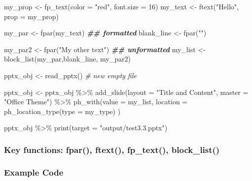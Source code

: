 \documentclass[
]{book}
\newenvironment{Shaded}{\begin{snugshade}}{\end{snugshade}}
\newcommand{\AttributeTok}[1]{\textcolor[rgb]{0.77,0.63,0.00}{#1}}
\newcommand{\CommentTok}[1]{\textcolor[rgb]{0.56,0.35,0.01}{\textit{#1}}}
\newcommand{\DecValTok}[1]{\textcolor[rgb]{0.00,0.00,0.81}{#1}}
\newcommand{\DocumentationTok}[1]{\textcolor[rgb]{0.56,0.35,0.01}{\textbf{\textit{#1}}}}
\newcommand{\FunctionTok}[1]{\textcolor[rgb]{0.00,0.00,0.00}{#1}}
\newcommand{\NormalTok}[1]{#1}
\newcommand{\OtherTok}[1]{\textcolor[rgb]{0.56,0.35,0.01}{#1}}
\newcommand{\SpecialCharTok}[1]{\textcolor[rgb]{0.00,0.00,0.00}{#1}}
\newcommand{\StringTok}[1]{\textcolor[rgb]{0.31,0.60,0.02}{#1}}
\begin{document}
\begin{Shaded}
\begin{Highlighting}[]
\NormalTok{my\_prop }\OtherTok{\textless{}{-}} \FunctionTok{fp\_text}\NormalTok{(}\AttributeTok{color =} \StringTok{"red"}\NormalTok{, }\AttributeTok{font.size =} \DecValTok{16}\NormalTok{)}
\NormalTok{my\_text }\OtherTok{\textless{}{-}} \FunctionTok{ftext}\NormalTok{(}\StringTok{"Hello"}\NormalTok{, }\AttributeTok{prop =}\NormalTok{ my\_prop)}

\NormalTok{my\_par }\OtherTok{\textless{}{-}} \FunctionTok{fpar}\NormalTok{(my\_text) }\DocumentationTok{\#\# formatted}
\NormalTok{blank\_line }\OtherTok{\textless{}{-}} \FunctionTok{fpar}\NormalTok{(}\StringTok{""}\NormalTok{)}

\NormalTok{my\_par2 }\OtherTok{\textless{}{-}} \FunctionTok{fpar}\NormalTok{(}\StringTok{"My other text"}\NormalTok{) }\DocumentationTok{\#\# unformatted}
\NormalTok{my\_list }\OtherTok{\textless{}{-}} \FunctionTok{block\_list}\NormalTok{(my\_par,blank\_line, my\_par2)}

\NormalTok{pptx\_obj }\OtherTok{\textless{}{-}} \FunctionTok{read\_pptx}\NormalTok{() }\CommentTok{\# new empty file}

\NormalTok{pptx\_obj }\OtherTok{\textless{}{-}}\NormalTok{ pptx\_obj }\SpecialCharTok{\%\textgreater{}\%}
  \FunctionTok{add\_slide}\NormalTok{(}\AttributeTok{layout =} \StringTok{"Title and Content"}\NormalTok{, }\AttributeTok{master =} \StringTok{"Office Theme"}\NormalTok{) }\SpecialCharTok{\%\textgreater{}\%} 
  \FunctionTok{ph\_with}\NormalTok{(}\AttributeTok{value =}\NormalTok{ my\_list, }\AttributeTok{location =} \FunctionTok{ph\_location\_type}\NormalTok{(}\AttributeTok{type =}\NormalTok{ my\_type) )}

\NormalTok{pptx\_obj }\SpecialCharTok{\%\textgreater{}\%}
  \FunctionTok{print}\NormalTok{(}\AttributeTok{target =} \StringTok{"output/test3.3.pptx"}\NormalTok{) }
\end{Highlighting}
\end{Shaded}

\hypertarget{key-functions-fpar-ftext-fp_text-block_list}{%
\subsubsection{Key functions: fpar(), ftext(), fp\_text(), block\_list()}\label{key-functions-fpar-ftext-fp_text-block_list}}

\hypertarget{example-code-1}{%
\subsubsection{Example Code}\label{example-code-1}}
\end{document}
